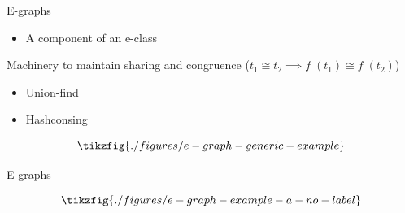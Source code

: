 \documentclass[aspectratio=169]{beamer}
\begin{document}
\begin{frame}{E-graphs}
\begin{minipage}{0.45\linewidth}
\begin{itemize}
    \item A component of an e-class
\end{itemize}
\vfill
Machinery to maintain \alert{sharing} and \alert{congruence} ($t_1 \cong t_2 \implies f\;(t_1) \cong f\;(t_2)$)
\begin{itemize}
    \item Union-find
    \item Hashconsing
\end{itemize}
\end{minipage}
\hfill
\begin{minipage}{0.45\linewidth}
\[
\tikzfig{./figures/e-graph-generic-example}
\]
\end{minipage}
\end{frame}

\begin{frame}{E-graphs}
\begin{example}[$(a * 2) / 2$]
    \[
    \tikzfig{./figures/e-graph-example-a-no-label}
    \]
\end{example}
\end{frame}
\end{document}
